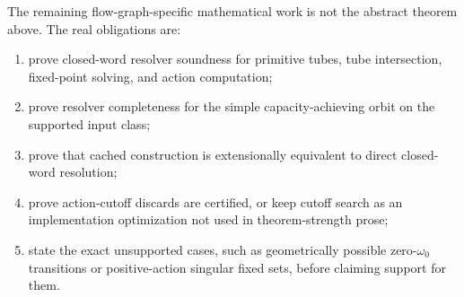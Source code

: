 \begin{remark}\label{rem:flow-graph-proof-obligations}
The remaining flow-graph-specific mathematical work is not the abstract theorem
above.  The real obligations are:
\begin{enumerate}
  \item prove closed-word resolver soundness for primitive tubes, tube
    intersection, fixed-point solving, and action computation;
  \item prove resolver completeness for the simple capacity-achieving orbit on
    the supported input class;
  \item prove that cached construction is extensionally equivalent to direct
    closed-word resolution;
  \item prove action-cutoff discards are certified, or keep cutoff search as an
    implementation optimization not used in theorem-strength prose;
  \item state the exact unsupported cases, such as geometrically possible
    zero-$\omega_0$ transitions or positive-action singular fixed sets, before
    claiming support for them.
\end{enumerate}
\end{remark}
